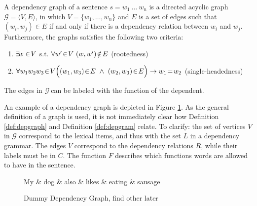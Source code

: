 \documentclass{report}
\begin{document}
\begin{definition}\label{def:depgraph}
A dependency graph of a sentence $s = w_1~\ldots~w_n$ is a directed acyclic graph $\mathcal{G} = \langle V, E\rangle$, in which $V = \{w_1, \ldots,w_n\}$ and $E$ is a set of edges such that $(w_i,w_j)\in E$ if and only if there is a dependency relation between $w_i$ and $w_j$. Furthermore, the graphs satisfies the following two criteria:
\begin{enumerate}
\item $\exists\negthinspace w\in\negthinspace V$ s.t. $\forall w'\negthinspace\in\negthinspace V~(w,w')\negthinspace\notin\negthinspace E$ \hfill (rootedness)
\item $\forall w_1 w_2 w_3\negthinspace \in\negthinspace V\Big( (w_1,w_3)\negthinspace\in\negthinspace E~\land~(w_2,w_3)\negthinspace \in\negthinspace E\Big) \rightarrow w_1\negthinspace=\negthinspace w_2$ \hfill (single-headedness)
\end{enumerate}
The edges in $\mathcal{G}~$can be labeled with the function of the dependent.
\end{definition}

\noindent An example of a dependency graph is depicted in Figure \ref{fig:depgraph}. As the general definition of a graph is used, it is not immediately clear how  Definition \ref{def:depgraph} and Definition \ref{def:depgram} relate. To clarify: the set of vertices $V$ in $\mathcal{G}$ correspond to the lexical items, and thus with the set $L$ in a dependency grammar. The edges $V$ correspond to the dependency relations $R$, while their labels must be in $C$. The function $F$ describes which functions words are allowed to have in the sentence. 

\begin{figure}[!ht]
\centering
\begin{dependency}[theme=simple]%
\begin{deptext}[column sep=.5cm, row sep=.1ex]
My \& dog \& also \& likes \& eating \& sausage \\
\end{deptext}
\end{dependency}
\caption{Dummy Dependency Graph, find other later}\label{fig:depgraph}
\end{figure}
\end{document}
